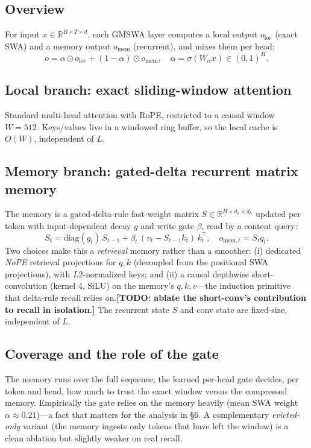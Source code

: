 \documentclass[letterpaper]{article} %
\newif\iftodoon \todoontrue
\newcommand{\todo}[1]{\iftodoon{\footnotesize\textbf{[TODO: #1]}}\fi}
\begin{document}
\subsection{Overview}
For input $x\in\mathbb{R}^{B\times T\times d}$, each GMSWA layer computes a local output $o_{\text{loc}}$ (exact SWA) and a memory output $o_{\text{mem}}$ (recurrent), and mixes them per head:
\begin{equation}
o = \alpha \odot o_{\text{loc}} + (1-\alpha)\odot o_{\text{mem}}, \quad \alpha=\sigma(W_\alpha x)\in(0,1)^{H}.
\end{equation}

\subsection{Local branch: exact sliding-window attention}
Standard multi-head attention with RoPE, restricted to a causal window $W{=}512$. Keys/values live in a windowed ring buffer, so the local cache is $O(W)$, independent of $L$.

\subsection{Memory branch: gated-delta recurrent matrix memory}
The memory is a gated-delta-rule fast-weight matrix $S\in\mathbb{R}^{H\times d_h\times d_h}$ updated per token with input-dependent decay $g$ and write gate $\beta$, read by a content query:
\begin{equation}
S_t = \mathrm{diag}(g_t)\,S_{t-1} + \beta_t\,(v_t - S_{t-1}k_t)\,k_t^\top,\quad o_{\text{mem},t}=S_t q_t.
\end{equation}
Two choices make this a \emph{retrieval} memory rather than a smoother: (i) dedicated \emph{NoPE} retrieval projections for $q,k$ (decoupled from the positional SWA projections), with $L2$-normalized keys; and (ii) a causal depthwise short-convolution (kernel 4, SiLU) on the memory's $q,k,v$---the induction primitive that delta-rule recall relies on.\todo{ablate the short-conv's contribution to recall in isolation.} The recurrent state $S$ and conv state are fixed-size, independent of $L$.

\subsection{Coverage and the role of the gate}
The memory runs over the full sequence; the learned per-head gate decides, per token and head, how much to trust the exact window versus the compressed memory. Empirically the gate relies on the memory heavily (mean SWA weight $\alpha\approx0.21$)---a fact that matters for the analysis in \S6. A complementary \emph{evicted-only} variant (the memory ingests only tokens that have left the window) is a clean ablation but slightly weaker on real recall.
\end{document}
